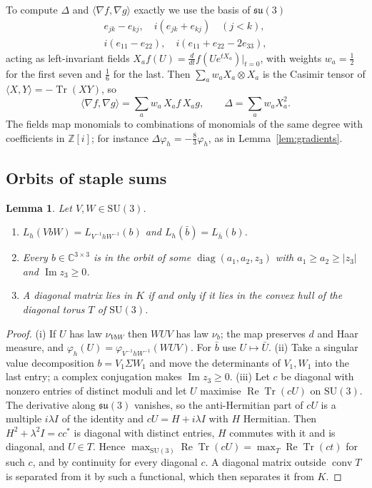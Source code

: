 \documentclass[aps,prd,twocolumn,superscriptaddress,nofootinbib,longbibliography,floatfix,amsmath,amssymb,10pt]{revtex4-2}
\newtheorem{lemma}[theorem]{Lemma}
\theoremstyle{definition}
\theoremstyle{remark}
\newcommand{\Z}{\mathbb{Z}}
\newcommand{\C}{\mathbb{C}}
\newcommand{\SU}{\mathrm{SU}}
\newcommand{\Tr}{\operatorname{Tr}}
\newcommand{\ReTr}{\operatorname{Re}\operatorname{Tr}}
\newcommand{\ip}[2]{\langle #1,#2\rangle}
\begin{document}
To compute $\Delta$ and $\ip{\nabla f}{\nabla g}$ exactly we use the basis of
$\mathfrak{su}(3)$
\[
\begin{gathered}
e_{jk}-e_{kj},\quad i(e_{jk}+e_{kj})\quad(j<k),\\
i(e_{11}-e_{22}),\quad i(e_{11}+e_{22}-2e_{33}),
\end{gathered}
\]
acting as left-invariant fields $X_af(U)=\frac d{dt}f(Ue^{tX_a})|_{t=0}$, with
weights $w_a=\frac12$ for the first seven and $\frac16$ for the last. Then
$\sum_aw_aX_a\otimes X_a$ is the Casimir tensor of $\ip XY=-\Tr(XY)$, so
\[
\ip{\nabla f}{\nabla g}=\sum_aw_a\,X_af\,X_ag,\qquad\Delta=\sum_aw_aX_a^2 .
\]
The fields map monomials to combinations of monomials of the same degree with
coefficients in $\Z[i]$; for instance $\Delta\varphi_h=-\frac83\varphi_h$, as in
Lemma~\ref{lem:gradients}.

\subsection{Orbits of staple sums}

\begin{lemma}\label{lem:orbits}
Let $V,W\in\SU(3)$.
\begin{enumerate}[label=\textup{(\roman*)},leftmargin=*]
\item $L_h(VbW)=L_{V^{-1}hW^{-1}}(b)$ and $L_h(\bar b)=L_{\bar h}(b)$.
\item Every $b\in\C^{3\times3}$ is in the orbit of some
$\operatorname{diag}(a_1,a_2,z_3)$ with $a_1\ge a_2\ge|z_3|$ and
$\operatorname{Im}z_3\ge0$.
\item A diagonal matrix lies in $K$ if and only if it lies in the convex hull
of the diagonal torus $T$ of $\SU(3)$.
\end{enumerate}
\end{lemma}

\begin{proof}
(i) If $U$ has law $\nu_{VbW}$ then $WUV$ has law $\nu_b$; the map preserves
$d$ and Haar measure, and $\varphi_h(U)=\varphi_{V^{-1}hW^{-1}}(WUV)$. For
$\bar b$ use $U\mapsto\bar U$. (ii) Take a singular value decomposition
$b=V_1\Sigma W_1$ and move the determinants of $V_1,W_1$ into the last
entry; a complex conjugation makes $\operatorname{Im}z_3\ge0$. (iii) Let $c$ be
diagonal with nonzero entries of distinct moduli and let $U$ maximise
$\ReTr(cU)$ on $\SU(3)$. The derivative along $\mathfrak{su}(3)$ vanishes, so
the anti-Hermitian part of $cU$ is a multiple $i\lambda I$ of the identity
and $cU=H+i\lambda I$ with $H$ Hermitian. Then $H^2+\lambda^2I=cc^*$ is diagonal
with distinct entries, $H$ commutes with it and is diagonal, and $U\in T$.
Hence $\max_{\SU(3)}\ReTr(cU)=\max_T\ReTr(ct)$ for such $c$, and by continuity
for every diagonal $c$. A diagonal matrix outside $\operatorname{conv}T$ is
separated from it by such a functional, which then separates it from $K$.
\end{proof}
\end{document}
